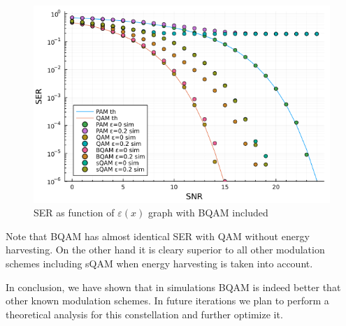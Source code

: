 \documentclass[11pt,a4paper,onecolumn,final]{article}
\newcommand{\en}[1]{\foreignlanguage{english}{#1}}
\newcommand{\eps}{\varepsilon}
\begin{document}
\begin{figure}[h]
    \centering
    \includegraphics[scale=0.58]{bqam_ex2_b.png}
    \caption{SER as function of \(\eps(x)\) graph with BQAM included}
\end{figure}
Note that BQAM has almost identical SER with QAM without energy harvesting. On the other hand it is cleary superior to all other modulation schemes including sQAM when energy harvesting is taken into account.  

In conclusion, we have shown that in simulations BQAM is indeed better that other known modulation schemes. 
In future iterations we plan to perform a theoretical analysis for this constellation and further optimize it. 




\en{}
\end{document}
